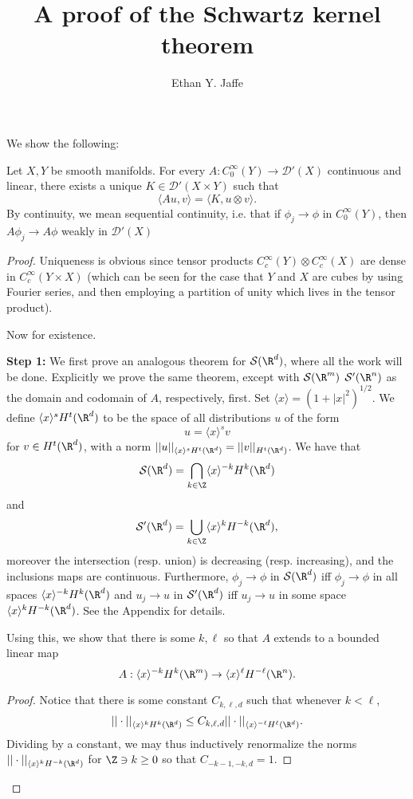 \documentclass[12pt]{article}
\title{A proof of the Schwartz kernel theorem}
\author{Ethan Y. Jaffe}
\date{}
\begin{document}
\maketitle
\setcounter{section}{1}
We show the following:
\begin{thm}Let $X,Y$ be smooth manifolds. For every $A:C_0^\infty(Y) \to \mathcal D'(X)$ continuous and linear, there exists a unique $K \in \mathcal D'(X\times Y)$ such that
\[\langle Au,v\rangle = \langle K,u\otimes v\rangle.\]
By continuity, we mean sequential continuity, i.e. that if $\phi_j \to \phi$ in $C_0^\infty(Y)$, then $A\phi_j \to A\phi$ weakly in $\mathcal D'(X)$\end{thm}
\begin{proof}
Uniqueness is obvious since tensor products $C_c^\infty(Y)\otimes C_c^\infty(X)$ are dense in $C_c^\infty(Y\times X)$ (which can be seen for the case that $Y$ and $X$ are cubes by using Fourier series, and then employing a partition of unity which lives in the tensor product).

Now for existence. 

\textbf{Step 1: }We first prove an analogous theorem for $\mathcal S(\R^d)$, where all the work will be done. Explicitly we prove the same theorem, except with $\mathcal S(\R^m)$ $\mathcal S'(\R^n)$ as the domain and codomain of $A$, respectively, first. Set $\langle x \rangle = (1+|x|^2)^{1/2}$. We define $\langle x \rangle^{s}H^{t}(\R^d)$ to be the space of all distributions $u$ of the form \[u = \langle x \rangle^{s}v\] for $v \in H^t(\R^d)$,
with a norm $||u||_{\langle x \rangle^{s}H^t(\R^d)} = ||v||_{H^t(\R^d)}$.
We have that
\[\mathcal S(\R^d) =  \bigcap_{k \in \Z} \langle x \rangle^{-k}H^k(\R^d)\]
and
\[\mathcal S'(\R^d) = \bigcup_{k \in \Z} \langle x \rangle^{k}H^{-k}(\R^d),\]
moreover the intersection (resp. union) is decreasing (resp. increasing), and the inclusions maps are continuous. 
Furthermore, $\phi_j \to \phi$ in $\mathcal S(\R^d)$ iff $\phi_j \to \phi$ in all spaces $\langle x \rangle^{-k}H^k(\R^d)$ and $u_j \to u$ in $\mathcal S'(\R^d)$ iff $u_j \to u$ in some space $\langle x \rangle^{k}H^{-k}(\R^d)$. See the Appendix for details.

Using this, we show that there is some $k,\ell$ so that $A$ extends to a bounded linear map
\[A:\langle x \rangle^{-k}H^k(\R^m) \to \langle x \rangle^{\ell}H^{-\ell}(\R^n).\]
\begin{proof} Notice that there is some constant $C_{k,\ell,d}$ such that whenever $k < \ell$,
\[||\cdot||_{\langle x \rangle^{k}H^k(\R^d)} \leq C_{k,\ell,d}||\cdot||_{\langle x \rangle^{-\ell}H^\ell(\R^d)}.\]
Dividing by a constant, we may thus inductively renormalize the norms $||\cdot||_{\langle x \rangle^{k}H^{-k}(\R^d)}$ for $\Z \ni k \geq 0$ so that $C_{-k-1,-k,d} = 1$.


\end{proof}
\end{proof}
\end{document}
